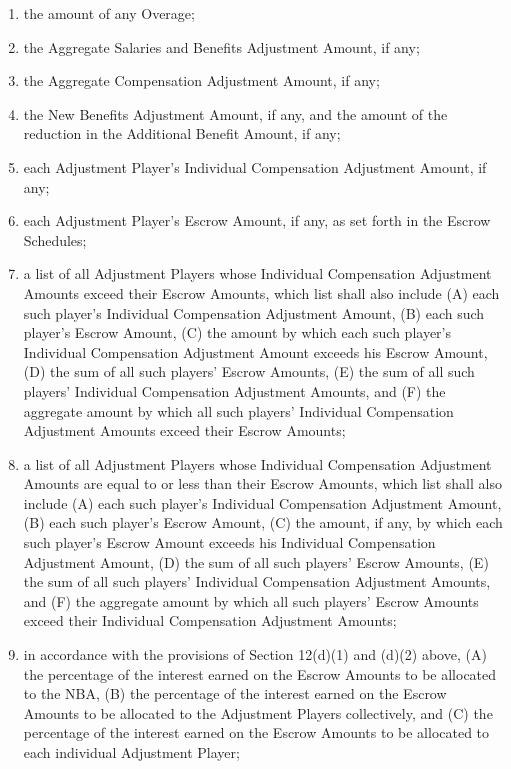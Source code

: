\documentclass[
]{book}
\providecommand{\tightlist}{%
  \setlength{\itemsep}{0pt}\setlength{\parskip}{0pt}}
\begin{document}
\begin{enumerate}
\begin{enumerate}
    \begin{enumerate}
    \def\labelenumiii{(\roman{enumiii})}
    \tightlist
    \item
      the amount of any Overage;
    \item
      the Aggregate Salaries and Benefits Adjustment Amount, if any;
    \item
      the Aggregate Compensation Adjustment Amount, if any;
    \item
      the New Benefits Adjustment Amount, if any, and the amount of the reduction in the Additional Benefit Amount, if any;
    \item
      each Adjustment Player's Individual Compensation Adjustment Amount, if any;
    \item
      each Adjustment Player's Escrow Amount, if any, as set forth in the Escrow Schedules;
    \item
      a list of all Adjustment Players whose Individual Compensation Adjustment Amounts exceed their Escrow Amounts, which list shall also include (A) each such player's Individual Compensation Adjustment Amount, (B) each such player's Escrow Amount, (C) the amount by which each such player's Individual Compensation Adjustment Amount exceeds his Escrow Amount, (D) the sum of all such players' Escrow Amounts, (E) the sum of all such players' Individual Compensation Adjustment Amounts, and (F) the aggregate amount by which all such players' Individual Compensation Adjustment Amounts exceed their Escrow Amounts;
    \item
      a list of all Adjustment Players whose Individual Compensation Adjustment Amounts are equal to or less than their Escrow Amounts, which list shall also include (A) each such player's Individual Compensation Adjustment Amount, (B) each such player's Escrow Amount, (C) the amount, if any, by which each such player's Escrow Amount exceeds his Individual Compensation Adjustment Amount, (D) the sum of all such players' Escrow Amounts, (E) the sum of all such players' Individual Compensation Adjustment Amounts, and (F) the aggregate amount by which all such players' Escrow Amounts exceed their Individual Compensation Adjustment Amounts;
    \item
      in accordance with the provisions of Section 12(d)(1) and (d)(2) above, (A) the percentage of the interest earned on the Escrow Amounts to be allocated to the NBA, (B) the percentage of the interest earned on the Escrow Amounts to be allocated to the Adjustment Players collectively, and (C) the percentage of the interest earned on the Escrow Amounts to be allocated to each individual Adjustment Player;

\end{enumerate}
\end{enumerate}
\end{enumerate}
\end{document}

